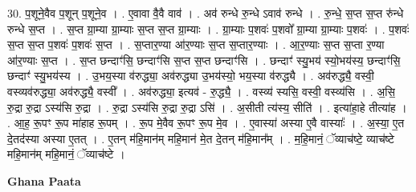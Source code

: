 \documentclass[17pt]{extarticle}
\begin{document}
30. प॒शूने॒वैव प॒शून् प॒शूने॒व । . ए॒वावा वै॒वै वाव॑ । . अव॑ रुन्धे रु॒न्धे ऽवाव॑ रुन्धे । . रु॒न्धे॒ स॒प्त स॒प्त रु॑न्धे रुन्धे स॒प्त । . स॒प्त ग्रा॒म्या ग्रा॒म्याः स॒प्त स॒प्त ग्रा॒म्याः । . ग्रा॒म्याः प॒शवः॑ प॒शवो᳚ ग्रा॒म्या ग्रा॒म्याः प॒शवः॑ । . प॒शवः॑ स॒प्त स॒प्त प॒शवः॑ प॒शवः॑ स॒प्त । . स॒प्तार॒ण्या आ॑र॒ण्याः स॒प्त स॒प्तार॒ण्याः । . आ॒र॒ण्याः स॒प्त स॒प्ता र॒ण्या आ॑र॒ण्याः स॒प्त । . स॒प्त छन्दाꣳ॑सि॒ छन्दाꣳ॑सि स॒प्त स॒प्त छन्दाꣳ॑सि । . छन्दाꣳ॑ स्यु॒भय॑ स्यो॒भय॑स्य॒ छन्दाꣳ॑सि॒ छन्दाꣳ॑ स्यु॒भय॑स्य । . उ॒भय॒स्या व॑रुद्ध्या॒ अव॑रुद्ध्या उ॒भय॑स्यो॒ भय॒स्या व॑रुद्ध्यै । . अव॑रुद्ध्यै॒ वस्वी॒ वस्व्यव॑रुद्ध्या॒ अव॑रुद्ध्यै॒ वस्वी᳚ । . अव॑रुद्ध्या॒ इत्यव॑ - रु॒द्ध्यै॒ । . वस्व्य॑ स्यसि॒ वस्वी॒ वस्व्य॑सि । . अ॒सि॒ रु॒द्रा रु॒द्रा ऽस्य॑सि रु॒द्रा । . रु॒द्रा ऽस्य॑सि रु॒द्रा रु॒द्रा ऽसि॑ । . अ॒सीती त्य॑स्य॒ सीति॑ । . इत्या॑हा॒हे तीत्या॑ह । . आ॒ह॒ रू॒पꣳ रू॒प मा॑हाह रू॒पम् । . रू॒प मे॒वैव रू॒पꣳ रू॒प मे॒व । . ए॒वास्या॑ अस्या ए॒वै वास्याः᳚ । . अ॒स्या॒ ए॒त दे॒तद॑स्या अस्या ए॒तत् । . ए॒तन् म॑हि॒मान॑म् महि॒मान॑ मे॒त दे॒तन् म॑हि॒मान᳚म् । . म॒हि॒मानं॒ ॅव्याच॑ष्टे॒ व्याच॑ष्टे महि॒मान॑म् महि॒मानं॒ ॅव्याच॑ष्टे । \newline

\textbf{Ghana Paata } \newline
\end{document}
